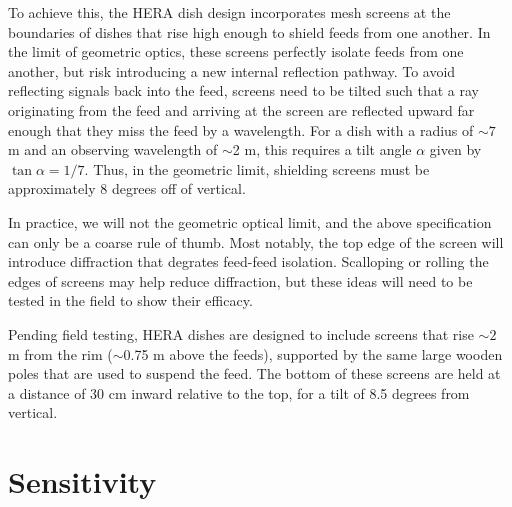 \documentclass[11pt]{article}
\begin{document}
To achieve this, the HERA dish design incorporates mesh screens at the boundaries of dishes that rise high
enough to shield feeds from one another.  In the limit of geometric optics, these screens perfectly isolate
feeds from one another, but risk introducing a new internal reflection pathway.  To avoid reflecting signals back into the feed,
screens need to be tilted such that a ray originating from the feed and arriving at the screen are
reflected upward far enough that they miss the feed by a wavelength.
For a dish with a radius of $\sim7$ m and an observing wavelength of $\sim$2 m, this requires a tilt angle $\alpha$
given by $\tan\alpha=1/7$.  Thus, in the geometric limit, shielding screens must be approximately 8 degrees off of vertical.

In practice, we will not the geometric optical limit, and the above specification can only be a coarse rule of thumb.
Most notably, the top edge of the screen will introduce diffraction that degrates feed-feed isolation.  Scalloping
or rolling the edges of screens may help reduce diffraction, but these ideas will need to be tested in the field to
show their efficacy.

Pending field testing, HERA dishes are designed to include screens that rise $\sim2$ m from the rim ($\sim$0.75 m above the 
feeds), supported
by the same large wooden poles that are used to suspend the feed.  The bottom of these screens are held at a distance of
30 cm inward relative to the top, for a tilt of 8.5 degrees from vertical.

\section{Sensitivity}
\end{document}
